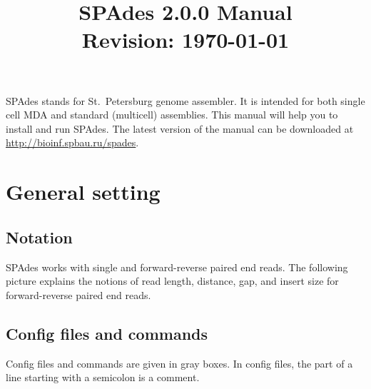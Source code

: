\documentclass{article}
\def\spades{SPAdes}
\begin{document}
\title{{\spades} 2.0.0 Manual\\{\small 
  Revision: \today}}
\date{}
\maketitle

{\spades} stands for St.~Petersburg genome assembler.
It is intended for both single cell MDA and standard (multicell) 
assemblies. 
This manual will help you to install and run
{\spades}. The latest version of the manual can be downloaded at \url{http://bioinf.spbau.ru/spades}.


\renewcommand{\contentsname}{}
\tableofcontents



\pagebreak

\section{General setting}
\subsection{Notation}
{\spades} works with single and forward-reverse paired end reads.
The following picture explains the notions of 
read length, distance, gap, and insert size
for forward-reverse paired end reads.

\begin{center}
\end{center}

\subsection{Config files and commands}
Config files and commands are given in gray boxes. 
In config files, the part of a line starting with a semicolon is a comment.
\end{document}

